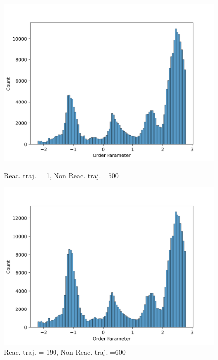 \documentclass[a4paper,8pt]{beamer}
\begin{document}
\begin{frame}
    \begin{figure}[ht]
        \begin{minipage}[b]{0.45\linewidth}
            \centering
            \includegraphics[width=\textwidth]{figures/1r_600n.png}
            \caption{Reac. traj. = 1, Non Reac. traj. =600}
            \label{fig:a}
        \end{minipage}
        \hspace{0.5cm}
        \begin{minipage}[b]{0.45\linewidth}
            \centering
            \includegraphics[width=\textwidth]{figures/190r_600n.png}
            \caption{Reac. traj. = 190, Non Reac. traj. =600}
            \label{fig:b}
        \end{minipage}
    \end{figure}
\end{frame}
\end{document}
